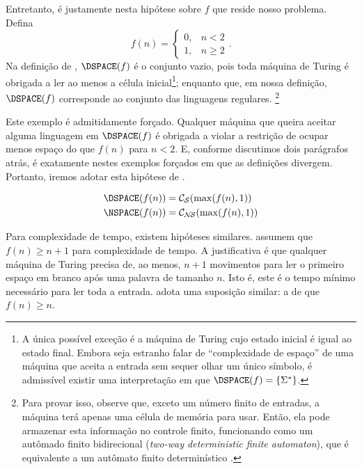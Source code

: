 Entretanto, é justamente nesta hipótese sobre $f$
que reside nosso problema. Defina
\begin{equation*}
    f(n) = \begin{cases}
        0, & n < 2 \\
        1, & n \geq 2
    \end{cases}.
\end{equation*}
Na definição de ,
$\DSPACE(f)$ é o conjunto vazio,
pois toda máquina de Turing
é obrigada a ler ao menos a célula inicial\footnote{
    A única possível exceção
    é a máquina de Turing
    cujo estado inicial é igual ao estado final.
    Embora seja estranho falar de ``complexidade de espaço''
    de uma máquina que aceita a entrada sem sequer olhar um único símbolo,
    é admissível existir uma interpretação em que
    $\DSPACE(f) = \{\Sigma^*\}$.
};
enquanto que, em nossa definição,
$\DSPACE(f)$ corresponde ao conjunto das linguagens regulares.
\footnote{
    Para provar isso, observe que,
    exceto um número finito de entradas,
    a máquina terá apenas uma célula de memória para usar.
    Então, ela pode armazenar esta informação no controle finito,
    funcionando como um autômado finito bidirecional
    (\emph{two-way deterministic finite automaton}),
    que é equivalente a um autômato finito determinístico
    \cite[p. 40]{HopcroftUllman1979}.
}

Este exemplo é admitidamente forçado.
Qualquer máquina que queira aceitar alguma linguagem em $\DSPACE(f)$
é obrigada a violar a restrição de
ocupar menos espaço do que $f(n)$
para $n < 2$.
E, conforme discutimos dois parágrafos atrás,
é exatamente nestes exemplos forçados
em que as definições divergem.
Portanto, iremos adotar esta hipótese de
.

\begin{definition}
    \begin{align*}
        \DSPACE(f(n)) &= \mathcal C_\PhiDS(\max(f(n), 1)) \\
        \NSPACE(f(n)) &= \mathcal C_\PhiNS(\max(f(n), 1))
    \end{align*}
\end{definition}

Para complexidade de tempo,
existem hipóteses similares.
assumem que $f(n) \geq n+1$
para complexidade de tempo.
A justificativa é que
qualquer máquina de Turing precisa de,
ao menos,
$n+1$ movimentos para ler o primeiro espaço em branco
após uma palavra de tamanho $n$.
Isto é,
este é o tempo mínimo necessário
para ler toda a entrada.
adota uma suposição similar:
a de que $f(n) \geq n$.

